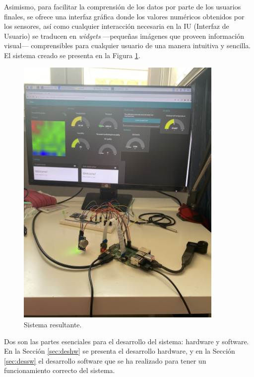 Asimismo, para facilitar la comprensión de los datos por parte de los usuarios finales, se ofrece una interfaz gráfica donde los valores numéricos obtenidos por los sensores, así como cualquier interacción necesaria en la IU (Interfaz de Usuario) se traducen en \textit{widgets} ---pequeñas imágenes que proveen información visual--- comprensibles para cualquier usuario de una manera intuitiva y sencilla. El sistema creado se presenta en la Figura \ref{fig:misistema}.\\
\begin{figure} [h!]
  \begin{center}
    \includegraphics[width=10cm]{figs/misistema}
  \end{center}
  \caption{Sistema resultante.}
  \label{fig:misistema}
\end{figure}

Dos son las partes esenciales para el desarrollo del sistema: hardware y software. En la Sección \ref{sec:deshw} se presenta el desarrollo hardware, y en la Sección \ref{sec:dessw} el desarrollo software que se ha realizado para tener un funcionamiento correcto del sistema.

